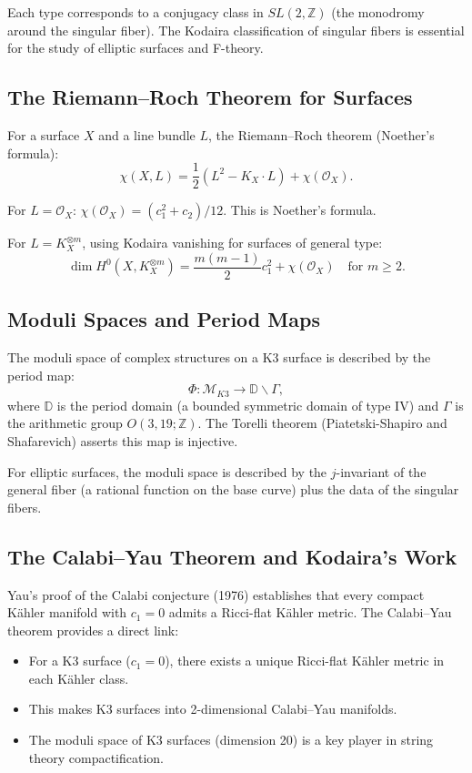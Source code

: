 Each type corresponds to a conjugacy class in $SL(2,\mathbb{Z})$ (the monodromy around the singular fiber). The Kodaira classification of singular fibers is essential for the study of elliptic surfaces and F-theory.

\subsection{The Riemann--Roch Theorem for Surfaces}

For a surface $X$ and a line bundle $L$, the Riemann--Roch theorem (Noether's formula):
\[
\chi(X, L) = \frac{1}{2} (L^2 - K_X \cdot L) + \chi(\mathcal{O}_X).
\]

For $L = \mathcal{O}_X$: $\chi(\mathcal{O}_X) = (c_1^2 + c_2)/12$. This is Noether's formula.

For $L = K_X^{\otimes m}$, using Kodaira vanishing for surfaces of general type:
\[
\dim H^0(X, K_X^{\otimes m}) = \frac{m(m-1)}{2} c_1^2 + \chi(\mathcal{O}_X) \quad \text{for } m \geq 2.
\]

\subsection{Moduli Spaces and Period Maps}

The moduli space of complex structures on a K3 surface is described by the period map:
\[
\Phi: \mathcal{M}_{K3} \to \mathbb{D} \backslash \Gamma,
\]
where $\mathbb{D}$ is the period domain (a bounded symmetric domain of type IV) and $\Gamma$ is the arithmetic group $O(3,19;\mathbb{Z})$. The Torelli theorem (Piatetski-Shapiro and Shafarevich) asserts this map is injective.

For elliptic surfaces, the moduli space is described by the $j$-invariant of the general fiber (a rational function on the base curve) plus the data of the singular fibers.

\subsection{The Calabi--Yau Theorem and Kodaira's Work}

Yau's proof of the Calabi conjecture (1976) establishes that every compact K\"{a}hler manifold with $c_1 = 0$ admits a Ricci-flat K\"{a}hler metric. The Calabi--Yau theorem provides a direct link:
\begin{itemize}
    \item For a K3 surface ($c_1 = 0$), there exists a unique Ricci-flat K\"{a}hler metric in each K\"{a}hler class.
    \item This makes K3 surfaces into 2-dimensional Calabi--Yau manifolds.
    \item The moduli space of K3 surfaces (dimension 20) is a key player in string theory compactification.
\end{itemize}

